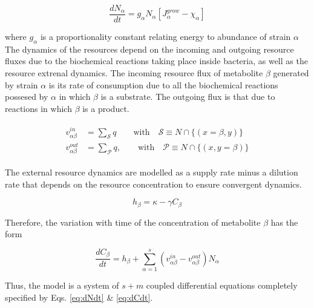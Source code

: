 \documentclass[titlepage,11pt]{article}
\begin{document}
\begin{linenumbers}
\begin{singlespace}
				\begin{linenomath*}	
					\begin{equation}\label{eq:dNdt}
					\dfrac{dN_{\alpha}}{dt} = g_{\alpha}N_{\alpha}\left[J_{\alpha}^{grow}-\chi_{\alpha}\right] 
					\end{equation}
				\end{linenomath*}
				where $ g_{\alpha} $ is a proportionality constant relating energy to abundance of strain $ \alpha $\\
				The dynamics of the resources depend on the incoming and outgoing resource fluxes due to the biochemical reactions taking place inside bacteria, as well as the resource extrenal dynamics. The incoming resource flux of metabolite $ \beta $  generated by strain $ \alpha $ is its rate of consumption due to all the biochemical reactions possesed by $ \alpha $ in which $ \beta $ is a substrate. The outgoing flux is that due to reactions in which $ \beta $ is a product.
				\begin{linenomath*}	
					\begin{align}
					\begin{split}
					v^{in}_{\alpha \beta} &= \sum_{\mathcal{S}} q   \qquad \textrm{with}  \quad  \mathcal{S} \equiv N \cap \{(x = \beta, y)\}\\
					v^{out}_{\alpha \beta} &= \sum_{\mathcal{P}} q , \qquad \textrm{with}  \quad  \mathcal{P} \equiv N \cap \{(x, y = \beta )\}
					\end{split}
					\end{align}
				\end{linenomath*}
				The external resource dynamics are modelled as a supply rate minus a dilution rate that depends on the resource concentration to ensure convergent dynamics. 
				\begin{linenomath*}	
					\begin{equation}
					h_{\beta}  =  \kappa - \gamma C_{\beta}
					\end{equation}
				\end{linenomath*}
				Therefore, the variation with time of the concentration of metabolite $ \beta $ has the form
				\begin{linenomath*}	
					\begin{equation}
					\dfrac{dC_{\beta}}{dt} = h_{\beta} + \sum_{{\alpha} = 1}^{s} \left(v_{{\alpha}\beta}^{in} -v_{{\alpha}\beta}^{out} \right)N_{\alpha} \label{eq:dCdt}
					\end{equation}
				\end{linenomath*}
				Thus, the model is a system of $ s + m $ coupled differential equations completely specified by Eqs. \ref{eq:dNdt} \& \ref{eq:dCdt}. \\
				

\end{singlespace}
\end{linenumbers}
\end{document}
